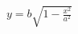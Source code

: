 \documentclass[preview]{standalone}
\begin{document}
\begin{align*}
y = b \sqrt{1 - \frac{x^2}{a^2}}
\end{align*}
\end{document}
